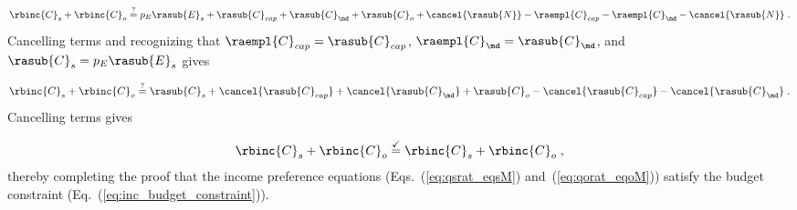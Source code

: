 \begin{equation}
  \rbinc{C}_s + \rbinc{C}_o \stackrel{?}{=} p_E \rasub{E}_s + \rasub{C}_{cap} + \rasub{C}_{\md} + \rasub{C}_o + \cancel{\rasub{N}}
    - \raempl{C}_{cap} - \raempl{C}_{\md} - \cancel{\rasub{N}} \; .
\end{equation}
%
Cancelling terms and recognizing that $\raempl{C}_{cap} = \rasub{C}_{cap}$, $\raempl{C}_{\md} = \rasub{C}_{\md}$, and
$\rasub{C}_s = p_E \rasub{E}_s$ gives

\begin{equation}
  \rbinc{C}_s + \rbinc{C}_o \stackrel{?}{=} \rasub{C}_s + \cancel{\rasub{C}_{cap}} + \cancel{\rasub{C}_{\md}} + \rasub{C}_o
        - \cancel{\rasub{C}_{cap}} - \cancel{\rasub{C}_{\md}} \; .
\end{equation}
%
Cancelling terms gives

\begin{equation}
  \rbinc{C}_s + \rbinc{C}_o \stackrel{\checkmark}{=} \rbinc{C}_s + \rbinc{C}_o \; ,
\end{equation}
%
thereby completing the proof that the income preference equations
(Eqs.~(\ref{eq:qsrat_eqsM}) and~(\ref{eq:qorat_eqoM}))
satisfy the budget constraint
(Eq.~(\ref{eq:inc_budget_constraint})).
